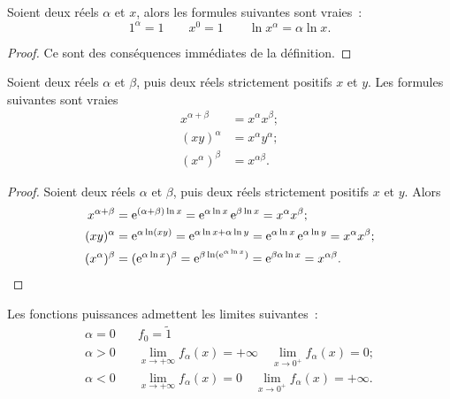 \begin{prop}
  Soient deux réels \(\alpha\) et \(x\), alors les formules suivantes sont 
  vraies~:
  \begin{equation}
    1^{\alpha} = 1 \qquad x^0 = 1 \qquad \ln x^{\alpha} = \alpha \ln x.
  \end{equation}
\end{prop}

\begin{proof}
  Ce sont des conséquences immédiates de la définition.
\end{proof}

\begin{prop}
  Soient deux réels \(\alpha\) et \(\beta\), puis deux réels strictement 
  positifs \(x\) et \(y\). Les formules suivantes sont vraies
  \begin{align}
    x^{\alpha+\beta} &= x^\alpha x^\beta;\\
    (xy)^\alpha &= x^\alpha y^\alpha;\\
    (x^\alpha)^\beta &= x^{\alpha\beta}.
  \end{align}
\end{prop}

\begin{proof}
  Soient deux réels \(\alpha\) et \(\beta\), puis deux réels strictement 
  positifs \(x\) et \(y\). Alors
  \begin{align*}
    x^{\alpha+\beta} & = \operatorname{e}^{(\alpha+\beta)\ln x} = \operatorname{e}^{\alpha \ln x} \operatorname{e}^{\beta 
    \ln x} = x^\alpha x^\beta;\\
      (xy)^\alpha & = \operatorname{e}^{\alpha \ln (xy)} = \operatorname{e}^{\alpha \ln x +\alpha \ln y} = 
      \operatorname{e}^{\alpha \ln x} \operatorname{e}^{\alpha \ln y} = x^\alpha x^\beta ;\\
      (x^\alpha)^\beta & = (\operatorname{e}^{\alpha \ln x})^\beta = \operatorname{e}^{\beta \ln(\operatorname{e}^{\alpha 
      \ln x})} = \operatorname{e}^{\beta \alpha \ln x} = x^{\alpha \beta}.
        \end{align*}
      \end{proof}

      Les fonctions puissances admettent les limites suivantes~:
      \begin{align}
        \alpha = 0 &\quad f_0 = \tilde{1} \\
        \alpha>0 &\quad \lim\limits_{x \to +\infty} f_\alpha(x) = +\infty \quad 
        \lim\limits_{x \to 0^{+}} f_\alpha(x) = 0;\\
        \alpha<0 &\quad \lim\limits_{x \to +\infty} f_\alpha(x) = 0 \quad 
        \lim\limits_{x \to 0^{+}} f_\alpha(x) = +\infty.
      \end{align}

